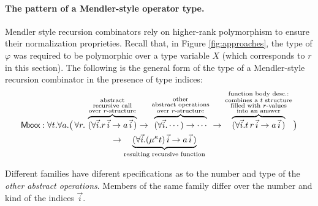 \paragraph{The pattern of a Mendler-style operator type.}
Mendler style recursion combinators rely on
higher-rank polymorphism to ensure their normalization proprieties. 
Recall that, in Figure \ref{fig:approaches},
the type of $\varphi$ was required to be polymorphic over a type variable
$X$ (which corresponds to $r$ in this section).
The following is the general form of the type of a Mendler-style
recursion combinator in the presence of type indices:
\begin{multline*}
 \textsf{Mxxx} : \forall t . \forall a .
   \big(\, \forall r . \;
      \overset{\begin{smallmatrix}
                        \text{abstract} \\
                        \text{recursive call} \\
                        \text{over $r$-structure}
                       \end{smallmatrix}}{\overbrace{
            (\forall\vec{i} . r\,\vec{i} -> a\,\vec{i}\,) }}
   -> \overset{\begin{smallmatrix}
                        \text{other} \\
                        \text{abstract operations} \\
                        \text{over $r$-structure}
                       \end{smallmatrix}}{\overbrace{
            (\forall\vec{i} . \cdots) -> \cdots }}
   -> \overset{\begin{smallmatrix}
                        \text{function body desc.:} \\
                        \text{combines a $t$ structure}\\
                        \text{filled with $r$-values} \\
                        \text{into an answer}
                       \end{smallmatrix}}{\overbrace{
            (\forall\vec{i} . t\, r\, \vec{i}  -> a\,\vec{i}\,) }}
   \big) \\
 -> \underset{\text{resulting recursive function}}{\underbrace{
       (\forall\vec{i} . (\mu^\kappa t)\,\vec{i} -> a\,\vec{i}\,) }}
\end{multline*}

Different families have diferent specifications as to the number and
type of the {\it other abstract operations}. Members of the same family
differ over the number and kind of the indices $\vec{i}$.


